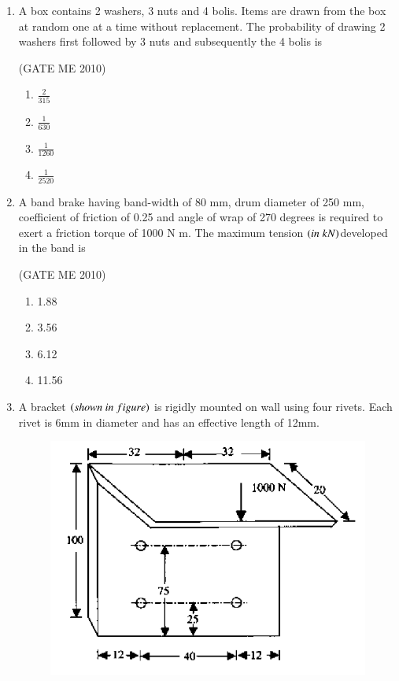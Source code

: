 \documentclass[journal,12pt,onecolumn]{IEEEtran}
\theoremstyle{remark}
\begin{document}
\begin{enumerate}
\item A box contains 2 washers, 3 nuts and 4 bolis. Items are drawn from the box at random one at a time without replacement. The probability of drawing 2 washers first followed by 3 nuts and subsequently the 4 bolis is

  \hfill{(GATE ME 2010)}
  
\begin{multicols}{4}
\begin{enumerate}
\item $\frac{2}{315}$
\item $\frac{1}{630}$
\item $\frac{1}{1260}$
\item $\frac{1}{2520}$

\end{enumerate}
\end{multicols}


\item A band brake having band-width of 80 mm, drum diameter of 250 mm, coefficient of friction of 0.25 and angle of wrap of 270 degrees is required to exert a friction torque of 1000 N m. The maximum tension $\left(in\;kN\right)$developed in the band is

  \hfill{(GATE ME 2010)}
  
\begin{multicols}{4}
\begin{enumerate}
\item 1.88
\item 3.56
\item 6.12
\item 11.56
\end{enumerate}
\end{multicols}


\item A bracket $\brak{shown\ in\ figure}$ is rigidly mounted on wall using four rivets. Each rivet is 6mm in diameter and has an effective length of 12mm.
 
 \begin{figure}[H]
    \centering
    \includegraphics[width=0.7\columnwidth]{figs/fig1.png}
    \caption*{}
    \label{fig:Q32}
\end{figure}



\end{enumerate}
\end{document}
